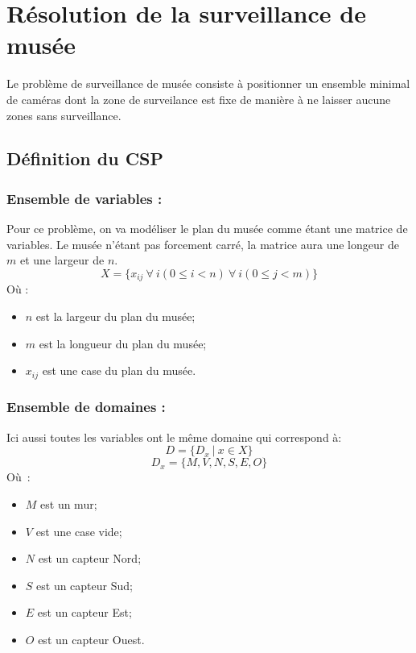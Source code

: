 \documentclass[a4paper,11pt]{article}
\begin{document}
\section{Résolution de la surveillance de musée}

    Le problème de surveillance de musée consiste à positionner un ensemble minimal de caméras dont la zone de surveilance est fixe de manière à ne laisser aucune zones sans surveillance.

    \subsection{Définition du CSP}
    
      \subsubsection{Ensemble de variables :}
          Pour ce problème, on va modéliser le plan du musée comme étant une matrice de variables. Le musée n'étant pas forcement carré, la matrice aura une longeur de $m$ et une largeur de $n$.
        \label{musee_variable}
        $$X = \{x_{ij}~\forall~i (0 \leq i < n)~\forall~i (0 \leq j < m) \}$$
        Où :
        \begin{itemize}
          \item $n$ est la largeur du plan du musée;
          \item $m$ est la longueur du plan du musée;
          \item $x_{ij}$ est une case du plan du musée.
        \end{itemize}

      \subsubsection{Ensemble de domaines :}
        Ici aussi toutes les variables ont le même domaine qui correspond à:
        \label{musee_domaine}
        $$D = \{D_{x}~|~x \in X\}$$ 
        $$D_{x} = \{M, V, N, S, E, O\}$$
        Où~:
        \begin{itemize}
          \item $M$ est un mur;
          \item $V$ est une case vide;
          \item $N$ est un capteur Nord;
          \item $S$ est un capteur Sud;
          \item $E$ est un capteur Est;
          \item $O$ est un capteur Ouest.
        \end{itemize}
\end{document}
